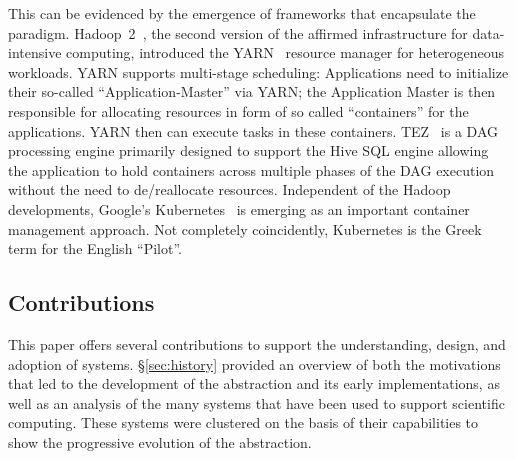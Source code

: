 \documentclass{sig-alternate}
\begin{document}
This can be evidenced by the emergence of frameworks that encapsulate the \pilot
paradigm. Hadoop~2~\cite{hadoop_url}, the second version of the affirmed
infrastructure for data-intensive computing, introduced the
YARN~\cite{vavilapalli2013apache} resource manager for heterogeneous workloads.
YARN supports multi-stage scheduling: Applications need to initialize their
so-called ``Application-Master'' via YARN; the Application Master is then
responsible for allocating resources in form of so called ``containers'' for the
applications. YARN then can execute tasks in these containers.
TEZ~\cite{tez_url} is a DAG processing engine primarily designed to support the
Hive SQL engine allowing the application to hold containers across multiple
phases of the DAG execution without the need to de/reallocate resources.
Independent of the Hadoop developments, Google's
Kubernetes~\cite{bernstein2014containers} is emerging as an important container
management approach. Not completely coincidently, Kubernetes is the Greek term
for the English ``Pilot''.



%
\subsection{Contributions}
\label{sec:contributions}



This paper offers several contributions to support the understanding, design,
and adoption of \pilot systems. \S\ref{sec:history} provided an overview of both
the motivations that led to the development of the \pilot abstraction and its
early implementations, as well as an analysis of the many \pilot systems that
have been used to support scientific computing. These systems were clustered on
the basis of their capabilities to show the progressive evolution of
the \pilot abstraction.
\end{document}
